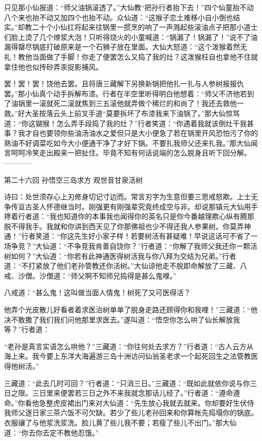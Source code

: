 \documentclass[12pt,UTF8]{ctexbook}
\begin{document}
只见那小仙报道：“师父油锅滚透了。”大仙教“把孙行者抬下去！”四个仙童抬不动八个来也抬不动又加四个也抬不动。众仙道：“这猴子恋土难移小自小倒也结实。”却教二十个小仙扛将起来往锅里一掼烹的响了一声溅起些滚油点子把那小道士们脸上烫了几个燎浆大泡！只听得烧火的小童喊道：“锅漏了！锅漏了！”说不了油漏得罄尽锅底打破原来是一个石狮子放在里面。大仙大怒道：“这个泼猴着然无礼！教他当面做了手脚！你走了便罢怎么又捣了我的灶？这泼猴枉自也拿他不住就拿住他也似抟砂弄汞捉影捕风。

罢！罢！罢！饶他去罢。且将唐三藏解下另换新锅把他扎一扎与人参树报报仇罢。”那小仙真个动手拆解布漆。行者在半空里听得明白他想着：“师父不济他若到了油锅里一滚就死二滚就焦到三五滚他就弄做个稀烂的和尚了！我还去救他一救。”好大圣按落云头上前叉手道“莫要拆坏了布漆我来下油锅了。”那大仙惊骂道：“你这猢猴！怎么弄手段捣了我的灶？”行者笑道：“你遇着我就该倒灶干我甚事？我才自也要领你些油汤油水之爱但只是大小便急了若在锅里开风恐怕污了你的熟油不好调菜吃如今大小便通干净了才好下锅。不要扎我师父还来扎我。”那大仙闻言呵呵冷笑走出殿来一把扯住。毕竟不知有何话说端的怎么脱身且听下回分解。
------------

第二十六回 孙悟空三岛求方 观世音甘泉活树

诗曰：处世须存心上刃修身切记寸边而。常言刃字为生意但要三思戒怒欺。上士无争传亘古圣人怀德继当时。刚强更有刚强辈究竟终成空与非。却说那镇元大仙用手搀着行者道：“我也知道你的本事我也闻得你的英名只是你今番越理欺心纵有腾那脱不得我手。我就和你讲到西天见了你那佛祖也少不得还我人参果树。你莫弄神通！”行者笑道：“你这先生好小家子样！若要树活有甚疑难！早说这话可不省了一场争竞？”大仙道：“不争竞我肯善自饶你？”行者道：“你解了我师父我还你一颗活树如何？”大仙道：“你若有此神通医得树活我与你八拜为交结为兄弟。”行者道：“不打紧放了他们老孙管教还你活树。”大仙谅他走不脱即命解放了三藏、八戒、沙僧。沙僧道：“师父啊不知师兄捣得是甚么鬼哩。”

八戒道：“甚么鬼！这叫做当面人情鬼！树死了又可医得活？

他弄个光皮散儿好看者着求医治树单单了脱身走路还顾得你和我哩！”三藏道：“他决不敢撒了我们我们问他那里求医去。”遂叫道：“悟空你怎么哄了仙长解放我等？”行者道：

“老孙是真言实语怎么哄他？”三藏道：“你往何处去求方？”行者道：“古人云方从海上来。我今要上东洋大海遍游三岛十洲访问仙翁圣老求一个起死回生之法管教医得他树活。”

三藏道：“此去几时可回？”行者道：“只消三日。”三藏道：“既如此就依你说与你三日之限。三日里来便罢若三日之外不来我就念那话儿经了。”行者道：“遵命遵命。”你看他急整虎皮裙出门来对大仙道：“先生放心我就去就来。你却要好生伏侍我师父逐日家三茶六饭不可欠缺。若少了些儿老孙回来和你算帐先捣塌你的锅底。衣服禳了与他浆洗浆洗。脸儿黄了些儿我不要；若瘦了些儿不出门。”那大仙道：“你去你去定不教他忍饿。”
\end{document}
